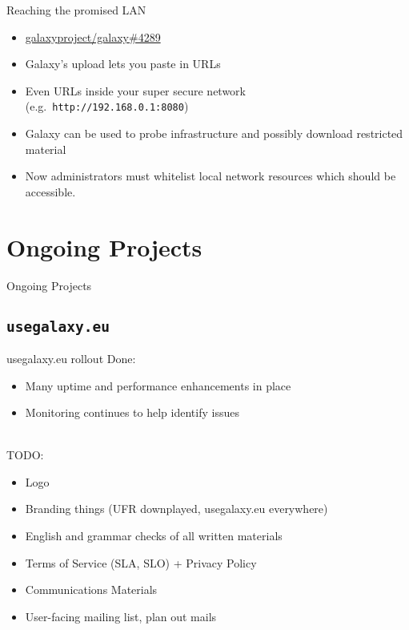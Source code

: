 \documentclass[12pt]{ufrslides}
\newcommand{\ghpr}[3]{\href{https://github.com/#1/#2/pull/#3}{#1/#2\##3}}
\begin{document}
	\begin{frame}{Reaching the promised LAN}
		\begin{itemize}
			\item \ghpr{galaxyproject}{galaxy}{4289}
			\item Galaxy's upload lets you paste in URLs
			\item Even URLs inside your super secure network (e.g.~\texttt{http://192.168.0.1:8080})
			\item Galaxy can be used to probe infrastructure and possibly download restricted material
			\item Now administrators must whitelist local network resources which should be accessible.
		\end{itemize}
	\end{frame}


\section[Ongoing]{Ongoing Projects}
\begin{frame}{Ongoing Projects}
\end{frame}

\subsection[Freiburg Galaxy]{\texttt{usegalaxy.eu}}

	\begin{frame}{usegalaxy.eu rollout}
		Done:
		\begin{itemize}
			\item Many uptime and performance enhancements in place
			\item Monitoring continues to help identify issues
		\end{itemize}
		\ \\[0.5cm]
		TODO:
		\begin{itemize}
			\item Logo
			\item Branding things (UFR downplayed, usegalaxy.eu everywhere)
			\item English and grammar checks of all written materials
			\item Terms of Service (SLA, SLO) + Privacy Policy
			\item Communications Materials
			\item User-facing mailing list, plan out mails
		\end{itemize}
	\end{frame}
\end{document}
